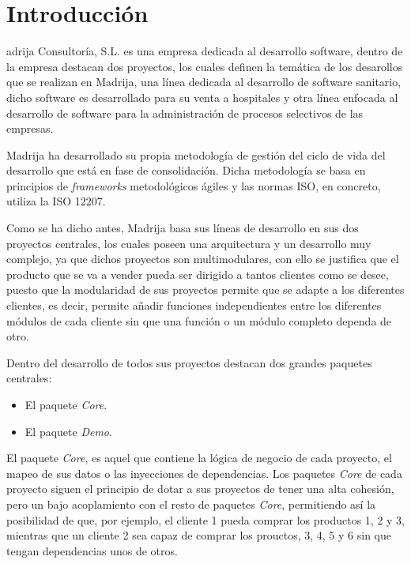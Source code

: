 \chapter{Introducción}

adrija Consultoría, S.L. es una empresa dedicada al desarrollo software, dentro de la empresa destacan dos proyectos, los cuales definen la temática de los desarollos que se realizan en \ac{Madrija}, una línea dedicada al desarrollo de software sanitario, dicho software es desarrollado para su venta a hospitales y otra línea enfocada al desarrollo de software para la administración de procesos selectivos de las empresas.

\ac{Madrija} ha desarrollado su propia metodología de gestión del ciclo de vida del desarrollo que está en fase de consolidación. Dicha metodología se basa en principios de \textit{frameworks} metodológicos ágiles y las normas \ac{ISO}, en concreto, utiliza la \ac{ISO} 12207\cite{ISO_12207}.

Como se ha dicho antes, \ac{Madrija} basa sus líneas de desarrollo en sus dos proyectos centrales, los cuales poseen una arquitectura y un desarrollo muy complejo, ya que dichos proyectos son multimodulares, con ello se justifica que el producto que se va a vender pueda ser dirigido a tantos clientes como se desee, puesto que la modularidad de sus proyectos permite que se adapte a los diferentes clientes, es decir, permite añadir funciones independientes entre los diferentes módulos de cada cliente sin que una función o un módulo completo dependa de otro.

Dentro del desarrollo de todos sus proyectos destacan dos grandes paquetes centrales:
\begin{itemize}
	\item El paquete \textit{Core}.
	\item El paquete \textit{Demo}.
\end{itemize}

El paquete \textit{Core}, es aquel que contiene la lógica de negocio de cada proyecto, el mapeo de sus datos o las inyecciones de dependencias. Los paquetes \textit{Core} de cada proyecto siguen el principio de dotar a sus proyectos de tener una alta cohesión, pero un bajo acoplamiento con el resto de paquetes \textit{Core}, permitiendo así la posibilidad de que, por ejemplo, el cliente 1 pueda comprar los productos 1, 2 y 3, mientras que un cliente 2 sea capaz de comprar los prouctos, 3, 4, 5 y 6 sin que tengan dependencias unos de otros.

